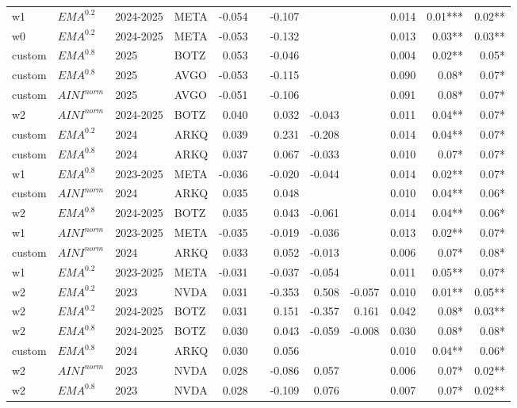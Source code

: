 {\begin{tabularx}{\textwidth}{@{}X@{\hspace{0.5pt}}X@{\hspace{0.5pt}}X@{\hspace{0.5pt}}X@{\hspace{2.0pt}} r r r r r r r r@{}}
w1 & $EMA^{0.2}$ & 2024-2025 & META & -0.054 &  & -0.107 &  &  & 0.014 & 0.01*** & 0.02** \\
w0 & $EMA^{0.2}$ & 2024-2025 & META & -0.053 &  & -0.132 &  &  & 0.013 & 0.03** & 0.03** \\
custom & $EMA^{0.8}$ & 2025 & BOTZ & 0.053 &  & -0.046 &  &  & 0.004 & 0.02** & 0.05* \\
custom & $EMA^{0.8}$ & 2025 & AVGO & -0.053 &  & -0.115 &  &  & 0.090 & 0.08* & 0.07* \\
custom & $AINI^{norm}$ & 2025 & AVGO & -0.051 &  & -0.106 &  &  & 0.091 & 0.08* & 0.07* \\
w2 & $AINI^{norm}$ & 2024-2025 & BOTZ & 0.040 &  & 0.032 & -0.043 &  & 0.011 & 0.04** & 0.07* \\
custom & $EMA^{0.2}$ & 2024 & ARKQ & 0.039 &  & 0.231 & -0.208 &  & 0.014 & 0.04** & 0.07* \\
custom & $EMA^{0.8}$ & 2024 & ARKQ & 0.037 &  & 0.067 & -0.033 &  & 0.010 & 0.07* & 0.07* \\
w1 & $EMA^{0.8}$ & 2023-2025 & META & -0.036 &  & -0.020 & -0.044 &  & 0.014 & 0.02** & 0.07* \\
custom & $AINI^{norm}$ & 2024 & ARKQ & 0.035 &  & 0.048 &  &  & 0.010 & 0.04** & 0.06* \\
w2 & $EMA^{0.8}$ & 2024-2025 & BOTZ & 0.035 &  & 0.043 & -0.061 &  & 0.014 & 0.04** & 0.06* \\
w1 & $AINI^{norm}$ & 2023-2025 & META & -0.035 &  & -0.019 & -0.036 &  & 0.013 & 0.02** & 0.07* \\
custom & $AINI^{norm}$ & 2024 & ARKQ & 0.033 &  & 0.052 & -0.013 &  & 0.006 & 0.07* & 0.08* \\
w1 & $EMA^{0.2}$ & 2023-2025 & META & -0.031 &  & -0.037 & -0.054 &  & 0.011 & 0.05** & 0.07* \\
w2 & $EMA^{0.2}$ & 2023 & NVDA & 0.031 &  & -0.353 & 0.508 & -0.057 & 0.010 & 0.01** & 0.05** \\
w2 & $EMA^{0.2}$ & 2024-2025 & BOTZ & 0.031 &  & 0.151 & -0.357 & 0.161 & 0.042 & 0.08* & 0.03** \\
w2 & $EMA^{0.8}$ & 2024-2025 & BOTZ & 0.030 &  & 0.043 & -0.059 & -0.008 & 0.030 & 0.08* & 0.08* \\
custom & $EMA^{0.8}$ & 2024 & ARKQ & 0.030 &  & 0.056 &  &  & 0.010 & 0.04** & 0.06* \\
w2 & $AINI^{norm}$ & 2023 & NVDA & 0.028 &  & -0.086 & 0.057 &  & 0.006 & 0.07* & 0.02** \\
w2 & $EMA^{0.8}$ & 2023 & NVDA & 0.028 &  & -0.109 & 0.076 &  & 0.007 & 0.07* & 0.02** \\

\end{tabularx}}
